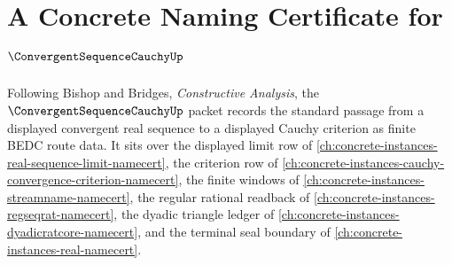 \chapter{A Concrete Naming Certificate for $\ConvergentSequenceCauchyUp$}
\label{ch:concrete-instances-convergent-sequence-cauchy-namecert}

Following Bishop and Bridges, \emph{Constructive Analysis}, the $\ConvergentSequenceCauchyUp$ packet records the standard passage from a displayed convergent real sequence to a displayed Cauchy criterion as finite BEDC route data. It sits over the displayed limit row of \autoref{ch:concrete-instances-real-sequence-limit-namecert}, the criterion row of \autoref{ch:concrete-instances-cauchy-convergence-criterion-namecert}, the finite windows of \autoref{ch:concrete-instances-streamname-namecert}, the regular rational readback of \autoref{ch:concrete-instances-regseqrat-namecert}, the dyadic triangle ledger of \autoref{ch:concrete-instances-dyadicratcore-namecert}, and the terminal seal boundary of \autoref{ch:concrete-instances-real-namecert}.

